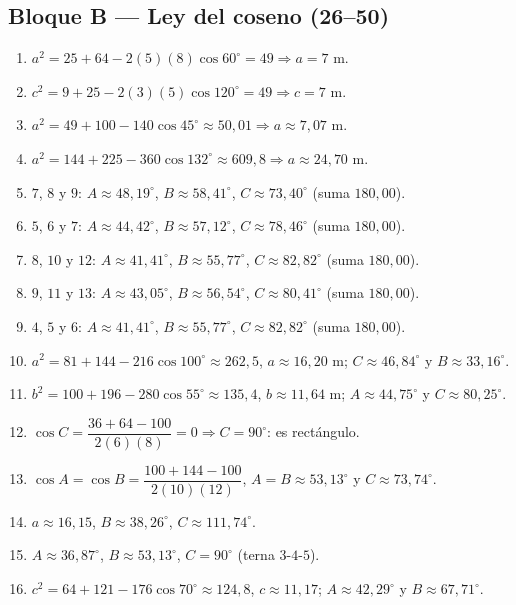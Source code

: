 \documentclass[12pt, letterpaper]{article}
\begin{document}
\subsection*{Bloque B — Ley del coseno (26--50)}
\begin{enumerate}[leftmargin=*, label=\textbf{\arabic*.}, start=26]
  \item $a^2=25+64-2(5)(8)\cos 60^\circ=49\Rightarrow a=7$ m.
  \item $c^2=9+25-2(3)(5)\cos 120^\circ=49\Rightarrow c=7$ m.
  \item $a^2=49+100-140\cos 45^\circ\approx 50{,}01\Rightarrow a\approx 7{,}07$ m.
  \item $a^2=144+225-360\cos 132^\circ\approx 609{,}8\Rightarrow a\approx 24{,}70$ m.
  \item $7$, $8$ y $9$: $A\approx 48{,}19^\circ$, $B\approx 58{,}41^\circ$, $C\approx 73{,}40^\circ$ (suma $180{,}00$).
  \item $5$, $6$ y $7$: $A\approx 44{,}42^\circ$, $B\approx 57{,}12^\circ$, $C\approx 78{,}46^\circ$ (suma $180{,}00$).
  \item $8$, $10$ y $12$: $A\approx 41{,}41^\circ$, $B\approx 55{,}77^\circ$, $C\approx 82{,}82^\circ$ (suma $180{,}00$).
  \item $9$, $11$ y $13$: $A\approx 43{,}05^\circ$, $B\approx 56{,}54^\circ$, $C\approx 80{,}41^\circ$ (suma $180{,}00$).
  \item $4$, $5$ y $6$: $A\approx 41{,}41^\circ$, $B\approx 55{,}77^\circ$, $C\approx 82{,}82^\circ$ (suma $180{,}00$).
  \item $a^2=81+144-216\cos 100^\circ\approx 262{,}5$, $a\approx 16{,}20$ m; $C\approx 46{,}84^\circ$ y $B\approx 33{,}16^\circ$.
  \item $b^2=100+196-280\cos 55^\circ\approx 135{,}4$, $b\approx 11{,}64$ m; $A\approx 44{,}75^\circ$ y $C\approx 80{,}25^\circ$.
  \item $\cos C=\dfrac{36+64-100}{2(6)(8)}=0\Rightarrow C=90^\circ$: es rectángulo.
  \item $\cos A=\cos B=\dfrac{100+144-100}{2(10)(12)}$, $A=B\approx 53{,}13^\circ$ y $C\approx 73{,}74^\circ$.
  \item $a\approx 16{,}15$, $B\approx 38{,}26^\circ$, $C\approx 111{,}74^\circ$.
  \item $A\approx 36{,}87^\circ$, $B\approx 53{,}13^\circ$, $C=90^\circ$ (terna $3$-$4$-$5$).
  \item $c^2=64+121-176\cos 70^\circ\approx 124{,}8$, $c\approx 11{,}17$; $A\approx 42{,}29^\circ$ y $B\approx 67{,}71^\circ$.

\end{enumerate}
\end{document}
